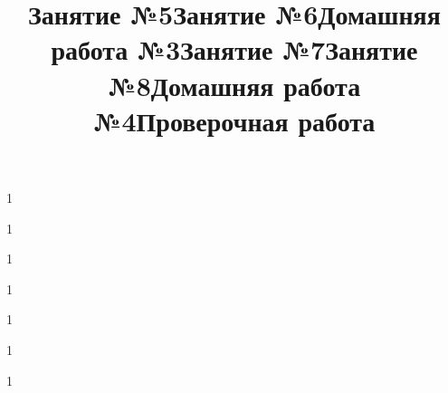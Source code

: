 \newpage
\title{Занятие №5}
\begin{listofex}
	\item 1
	
\end{listofex}
\newpage
\title{Занятие №6}
\begin{listofex}
	\item 1
	
\end{listofex}
\newpage
\title{Домашняя работа №3}
\begin{listofex}
	\item 1
	
\end{listofex}
\newpage
\title{Занятие №7}
\begin{listofex}
	\item 1
	
\end{listofex}
\newpage
\title{Занятие №8}
\begin{listofex}
	\item 1
	
\end{listofex}
\newpage
\title{Домашняя работа №4}
\begin{listofex}
	\item 1
	
\end{listofex}
\newpage
\title{Проверочная работа}
\begin{listofex}
	\item 1
	
\end{listofex}